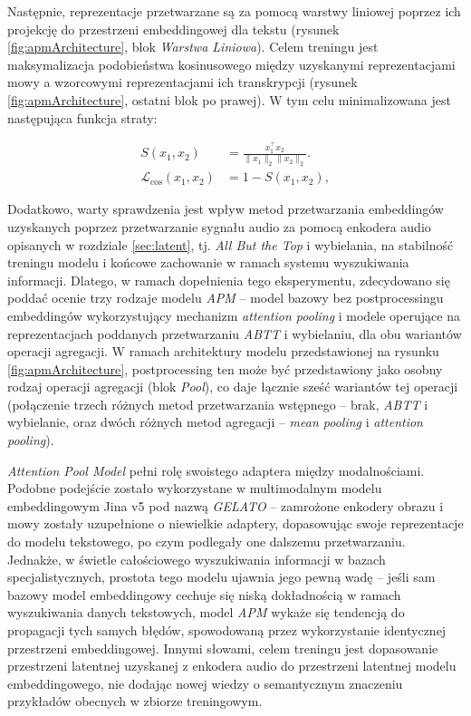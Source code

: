 Następnie, reprezentacje przetwarzane są za pomocą warstwy liniowej poprzez ich projekcję do przestrzeni embeddingowej dla tekstu (rysunek \ref{fig:apmArchitecture}, blok \textit{Warstwa Liniowa}). Celem treningu jest maksymalizacja podobieństwa kosinusowego między uzyskanymi reprezentacjami mowy a wzorcowymi reprezentacjami ich transkrypcji (rysunek \ref{fig:apmArchitecture}, ostatni blok po prawej). W tym celu minimalizowana jest następująca funkcja straty:

\begin{equation}
    \begin{aligned}
        S(x_1, x_2) &= \frac{x_1^\top x_2} {\lVert x_1\rVert_2 \lVert x_2\rVert_2}.\\
        \mathcal{L}_{\mathrm{cos}}(x_1, x_2) &= 1 - S(x_1, x_2),
    \end{aligned}
\end{equation}

Dodatkowo, warty sprawdzenia jest wpływ metod przetwarzania embeddingów uzyskanych poprzez przetwarzanie sygnału audio za pomocą enkodera audio opisanych w rozdziale \ref{sec:latent}, tj. \textit{All But the Top} i wybielania, na stabilność treningu modelu i końcowe zachowanie w ramach systemu wyszukiwania informacji. Dlatego, w ramach dopełnienia tego eksperymentu, zdecydowano się poddać ocenie trzy rodzaje modelu \textit{APM} -- model bazowy bez postprocessingu embeddingów wykorzystujący mechanizm \textit{attention pooling} i modele operujące na reprezentacjach poddanych przetwarzaniu \textit{ABTT} i wybielaniu, dla obu wariantów operacji agregacji. W ramach architektury modelu przedstawionej na rysunku \ref{fig:apmArchitecture}, postprocessing ten może być przedstawiony jako osobny rodzaj operacji agregacji (blok \textit{Pool}), co daje łącznie sześć wariantów tej operacji (połączenie trzech różnych metod przetwarzania wstępnego -- brak, \textit{ABTT} i wybielanie, oraz dwóch różnych metod agregacji -- \textit{mean pooling} i \textit{attention pooling}).

\textit{Attention Pool Model} pełni rolę swoistego adaptera między modalnościami. Podobne podejście zostało wykorzystane w multimodalnym modelu embeddingowym Jina v5 \cite{Jina5} pod nazwą \textit{GELATO} -- zamrożone enkodery obrazu i mowy zostały uzupełnione o niewielkie adaptery, dopasowując swoje reprezentacje do modelu tekstowego, po czym podlegały one dalszemu przetwarzaniu. Jednakże, w świetle całościowego wyszukiwania informacji w bazach specjalistycznych, prostota tego modelu ujawnia jego pewną wadę -- jeśli sam bazowy model embeddingowy cechuje się niską dokładnością w ramach wyszukiwania danych tekstowych, model \textit{APM} wykaże się tendencją do propagacji tych samych błędów, spowodowaną przez wykorzystanie identycznej przestrzeni embeddingowej. Innymi słowami, celem treningu jest dopasowanie przestrzeni latentnej uzyskanej z enkodera audio do przestrzeni latentnej modelu embeddingowego, nie dodając nowej wiedzy o semantycznym znaczeniu przykładów obecnych w zbiorze treningowym.


